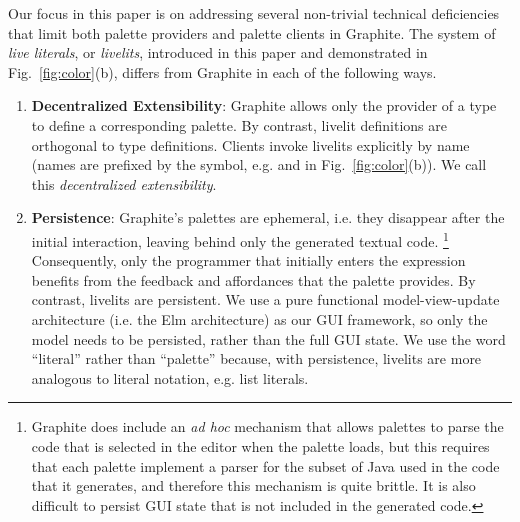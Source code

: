 Our focus in this paper is on addressing several non-trivial technical 
deficiencies that limit both palette providers and palette clients in Graphite. 
The system of \emph{live literals}, or \emph{livelits}, introduced in
this paper and demonstrated in Fig.~\ref{fig:color}(b), differs from Graphite  
in each of the following ways.
\begin{enumerate}
  \setlength\itemsep{0.5em}
  \item \textbf{Decentralized Extensibility}: 
    Graphite allows only the provider of a type to define a corresponding palette. 
    By contrast, livelit definitions are orthogonal to type definitions. 
    Clients invoke livelits explicitly by name (names are prefixed by the \li{\$} symbol, 
    e.g.  and  in Fig.~\ref{fig:color}(b)).
    We call this \emph{decentralized extensibility}.
  \item \textbf{Persistence}: Graphite's palettes are {ephemeral}, 
  i.e. they disappear after the initial interaction, 
  leaving behind only the generated textual code.%
  \footnote{Graphite does include an \emph{ad hoc} mechanism that 
  allows palettes to parse the code that is selected in the editor 
  when the palette loads, but this requires that each palette implement 
  a parser for the subset of Java used in the code that it generates,
  and therefore this mechanism is quite brittle. It is also difficult 
  to persist GUI state that is not included in the generated code.}
  Consequently, only the programmer that initially enters the expression 
  benefits from the feedback and affordances that the palette provides.
  By contrast, livelits are persistent. We use a pure functional model-view-update architecture 
  (i.e. the Elm architecture) as our GUI framework, 
  so only the model needs to be persisted, rather than the full GUI state.  
  We use the word ``literal'' rather than ``palette'' because, with persistence, livelits
  are more analogous to literal notation, e.g. list literals.


\end{enumerate}
